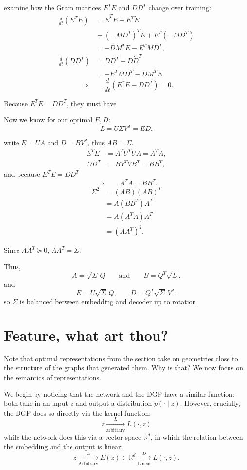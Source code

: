 \documentclass[11pt]{article}
\begin{document}
examine how the Gram matrices $E^T E$ and $DD^T$ change over training:
\begin{align*}
\frac{d}{dt}\left(E^T E\right)
&=\dot E^T E+E^T\dot E\\
&=\left(-MD^T\right)^T E
  +E^T\left(-MD^T\right)\\
&=-DM^T E-E^T MD^T,\\[0.75em]
\frac{d}{dt}\left(DD^T\right)
&=\dot D D^T+D\dot D^T\\
&=-E^T MD^T-DM^T E.
\end{align*}
\[
\Longrightarrow\qquad
\frac{d}{dt}\left(E^T E-DD^T\right)=0.
\]

Because $E^T E=DD^T$, they must have

Now we know for our optimal $E,D$:
\[
L=U\Sigma V^T=ED.
\]

write $E=UA$ and $D=BV^T$, thus $AB=\Sigma$.
\begin{align*}
E^T E
&=A^T U^T UA=A^T A,\\
DD^T
&=BV^T VB^T=BB^T,
\end{align*}
and because $E^T E=DD^T$
\[
\Longrightarrow\qquad A^T A=BB^T.
\]
\begin{align*}
\Sigma^2
&=(AB)(AB)^T\\
&=A(BB^T)A^T\\
&=A(A^T A)A^T\\
&=(AA^T)^2.
\end{align*}

Since $AA^T\succeq 0$, $AA^T=\Sigma$.

Thus,
\[
A=\sqrt{\Sigma}\,Q
\qquad\text{and}\qquad
B=Q^T\sqrt{\Sigma}.
\]
and
\[
E=U\sqrt{\Sigma}\,Q,
\qquad
D=Q^T\sqrt{\Sigma}\,V^T.
\]
so $\Sigma$ is balanced between embedding and decoder up to rotation.

\section{Feature, what art thou?}

Note that optimal representations from the section take on geometries close to the structure of the graphs that generated them. Why is that? We now focus on the semantics of representations.

We begin by noticing that the network and the DGP have a similar function: both take in an input $z$ and output a distribution $p(\cdot\mid z)$. However, crucially, the DGP does so directly via the kernel function:
\[
z\xrightarrow[\text{arbitrary}]{L}L(\cdot,z)
\]
while the network does this via a vector space $\mathbb R^d$, in which the relation between the embedding and the output is linear:
\[
z\xrightarrow[\text{Arbitrary}]{E}E(z)\in\mathbb R^d
\xrightarrow[\text{Linear}]{D}L(\cdot,z).
\]
\end{document}
